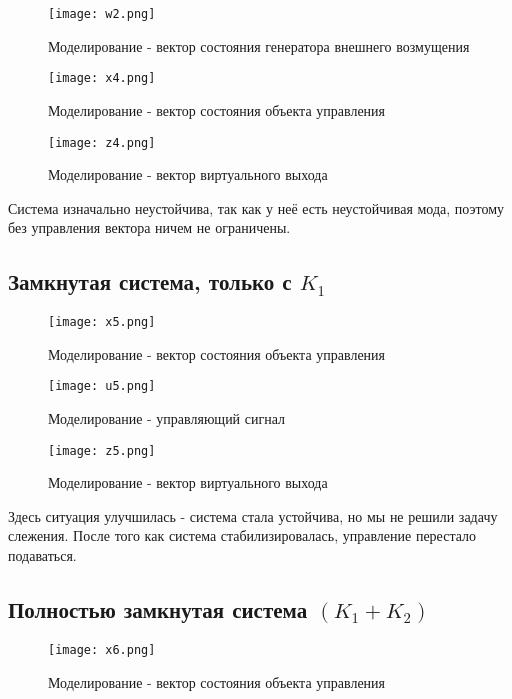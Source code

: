 \begin{figure}[ht]
  \centering
  \texttt{[image: w2.png]}
  \caption{Моделирование - вектор состояния генератора внешнего возмущения}
\end{figure}

\begin{figure}[ht]
  \centering
  \texttt{[image: x4.png]}
  \caption{Моделирование - вектор состояния объекта управления}
\end{figure}

\begin{figure}[ht]
  \centering
  \texttt{[image: z4.png]}
  \caption{Моделирование - вектор виртуального выхода}
\end{figure}

Система изначально неустойчива, так как у неё есть неустойчивая мода, поэтому без управления вектора ничем не ограничены.

\newpage
\subsection{Замкнутая система, только с $K_1$}


\begin{figure}[ht]
  \centering
  \texttt{[image: x5.png]}
  \caption{Моделирование - вектор состояния объекта управления}
\end{figure}

\begin{figure}[ht]
  \centering
  \texttt{[image: u5.png]}
  \caption{Моделирование - управляющий сигнал}
\end{figure}


\begin{figure}[ht]
  \centering
  \texttt{[image: z5.png]}
  \caption{Моделирование - вектор виртуального выхода}
\end{figure}

Здесь ситуация улучшилась - система стала устойчива, но мы не решили задачу слежения.
После того как система стабилизировалась, управление перестало подаваться.

\newpage
\subsection{Полностью замкнутая система $(K_1 + K_2)$}

\begin{figure}[ht]
  \centering
  \texttt{[image: x6.png]}
  \caption{Моделирование - вектор состояния объекта управления}
\end{figure}

